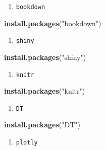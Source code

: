 \documentclass[
]{book}
\newenvironment{Shaded}{\begin{snugshade}}{\end{snugshade}}
\newcommand{\KeywordTok}[1]{\textcolor[rgb]{0.13,0.29,0.53}{\textbf{#1}}}
\newcommand{\NormalTok}[1]{#1}
\newcommand{\StringTok}[1]{\textcolor[rgb]{0.31,0.60,0.02}{#1}}
\providecommand{\tightlist}{%
  \setlength{\itemsep}{0pt}\setlength{\parskip}{0pt}}
\begin{document}
\begin{enumerate}
\def\labelenumi{\arabic{enumi}.}
\setcounter{enumi}{1}
\tightlist
\item
  \texttt{bookdown}
\end{enumerate}

\begin{Shaded}
\begin{Highlighting}[]
\KeywordTok{install.packages}\NormalTok{(}\StringTok{"bookdown"}\NormalTok{)}
\end{Highlighting}
\end{Shaded}

\begin{enumerate}
\def\labelenumi{\arabic{enumi}.}
\setcounter{enumi}{2}
\tightlist
\item
  \texttt{shiny}
\end{enumerate}

\begin{Shaded}
\begin{Highlighting}[]
\KeywordTok{install.packages}\NormalTok{(}\StringTok{"shiny"}\NormalTok{)}
\end{Highlighting}
\end{Shaded}

\begin{enumerate}
\def\labelenumi{\arabic{enumi}.}
\setcounter{enumi}{3}
\tightlist
\item
  \texttt{knitr}
\end{enumerate}

\begin{Shaded}
\begin{Highlighting}[]
\KeywordTok{install.packages}\NormalTok{(}\StringTok{"knitr"}\NormalTok{)}
\end{Highlighting}
\end{Shaded}

\begin{enumerate}
\def\labelenumi{\arabic{enumi}.}
\setcounter{enumi}{4}
\tightlist
\item
  \texttt{DT}
\end{enumerate}

\begin{Shaded}
\begin{Highlighting}[]
\KeywordTok{install.packages}\NormalTok{(}\StringTok{"DT"}\NormalTok{)}
\end{Highlighting}
\end{Shaded}

\begin{enumerate}
\def\labelenumi{\arabic{enumi}.}
\setcounter{enumi}{5}
\tightlist
\item
  \texttt{plotly}
\end{enumerate}
\end{document}
